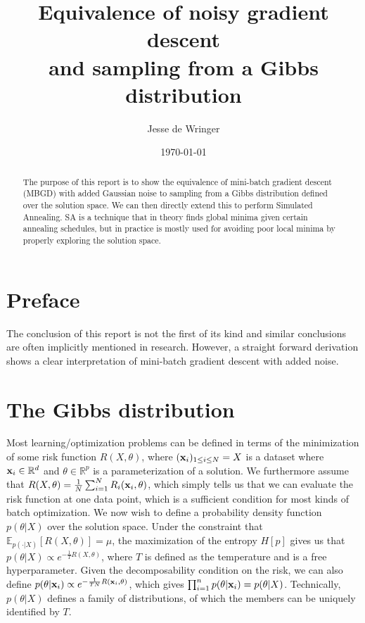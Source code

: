 \documentclass[twocolumn]{article}
\title{Equivalence of noisy gradient descent\\and sampling from a Gibbs distribution}
\author{Jesse de Wringer}
\date{\today}
\begin{document}
\maketitle
\begin{abstract}
The purpose of this report is to show the equivalence of mini-batch gradient descent (MBGD) with added Gaussian noise to sampling from a Gibbs distribution defined over the solution space. We can then directly extend this to perform Simulated Annealing. SA is a technique that in theory finds global minima given certain annealing schedules, but in practice is mostly used for avoiding poor local minima by properly exploring the solution space.
\end{abstract}

\section{Preface}
The conclusion of this report is not the first of its kind and similar conclusions are often implicitly mentioned in research. However, a straight forward derivation shows a clear interpretation of mini-batch gradient descent with added noise.

\section{The Gibbs distribution}
Most learning/optimization problems can be defined in terms of the minimization of some risk function $R(X, \theta)$, where $(\bold{x}_i)_{1\leq i \leq N} = X$ is a dataset where $\bold{x}_i \in \mathbb{R}^d$ and $\theta \in \mathbb{R}^p$ is a parameterization of a solution. We furthermore assume that $R(X, \theta) = \frac{1}{N} \sum_{i=1}^NR_i(\bold{x}_i, \theta)$, which simply tells us that we can evaluate the risk function at one data point, which is a sufficient condition for most kinds of batch optimization. We now wish to define a probability density function $p(\theta|X)$ over the solution space. Under the constraint that $\mathbb{E}_{p(\cdot|X)}[R(X, \theta)] = \mu$, the maximization of the entropy $H[p]$ gives us that $p(\theta|X) \propto e^{-\frac{1}{T}R(X, \theta)}$, where $T$ is defined as the temperature and is a free hyperparameter. Given the decomposability condition on the risk, we can also define $p(\theta|\bold{x}_i) \propto e^{-\frac{1}{TN}R(\bold{x}_i, \theta)}$, which gives $\prod_{i=1}^n p(\theta|\bold{x}_i) = p(\theta|X)$. Technically, $p(\theta|X)$ defines a family of distributions, of which the members can be uniquely identified by $T$.
\end{document}

